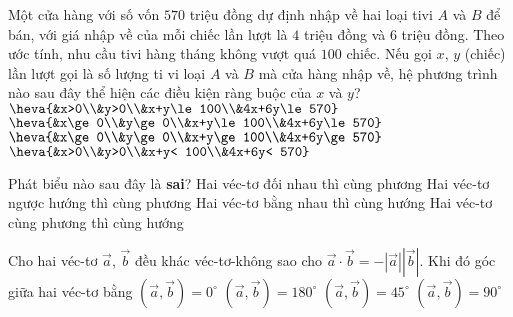 \begin{ex}%
	Một cửa hàng với số vốn $570$ triệu đồng dự định nhập về hai loại tivi $A$ và $B$ để bán, với giá nhập về của mỗi chiếc lần lượt là $4$ triệu đồng và $6$ triệu đồng. Theo ước tính, nhu cầu tivi hàng tháng không vượt quá $100$ chiếc. Nếu gọi $x$, $y$ (chiếc) lần lượt gọi là số lượng ti vi loại $A$ và $B$ mà cửa hàng nhập về, hệ phương trình nào sau đây thể hiện các điều kiện ràng buộc của $x$ và $y$?
	\choice
	{$\heva{&x>0\\&y>0\\&x+y\le 100\\&4x+6y\le 570}$}
	{\True $\heva{&x\ge 0\\&y\ge 0\\&x+y\le 100\\&4x+6y\le 570}$}
	{$\heva{&x\ge 0\\&y\ge 0\\&x+y\ge 100\\&4x+6y\ge 570}$}
	{$\heva{&x>0\\&y>0\\&x+y< 100\\&4x+6y< 570}$}
\end{ex}
\begin{ex}%
	Phát biểu nào sau đây là \textbf{sai}?
	\choice
	{Hai véc-tơ đối nhau thì cùng phương}
	{Hai véc-tơ ngược hướng thì cùng phương}
	{Hai véc-tơ bằng nhau thì cùng hướng}
	{\True Hai véc-tơ cùng phương thì cùng hướng}
\end{ex}
\begin{ex}%
	Cho hai véc-tơ $\overrightarrow{a}$, $\overrightarrow{b}$ đều khác véc-tơ-không sao cho $\overrightarrow{a}\cdot\overrightarrow{b}=-\left|\overrightarrow{a}\right|\left|\overrightarrow{b}\right|$. Khi đó góc giữa hai véc-tơ bằng
	\choice
	{$\left(\overrightarrow{a},\overrightarrow{b}\right)=0^\circ$}
	{\True $\left(\overrightarrow{a},\overrightarrow{b}\right)=180^\circ$}
	{$\left(\overrightarrow{a},\overrightarrow{b}\right)=45^\circ$}
	{$\left(\overrightarrow{a},\overrightarrow{b}\right)=90^\circ$}
\end{ex}

